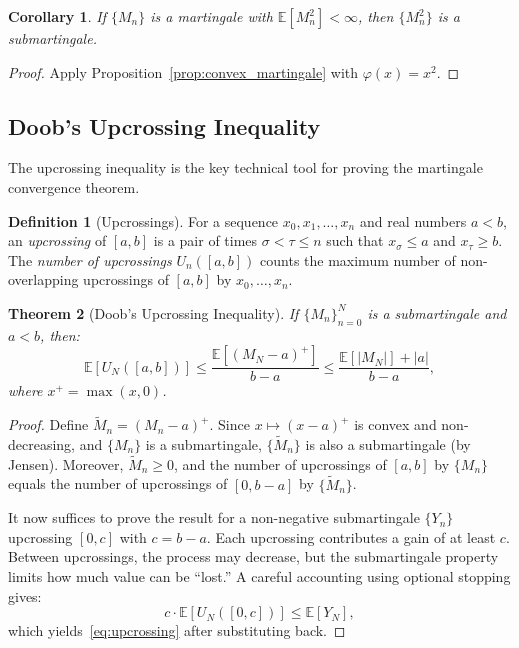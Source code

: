 \documentclass[11pt,a4paper]{article}
\theoremstyle{definition}
\newtheorem{definition}{Definition}[section]
\theoremstyle{plain}
\newtheorem{theorem}{Theorem}[section]
\newtheorem{corollary}[theorem]{Corollary}
\theoremstyle{remark}
\newcommand{\E}{\mathbb{E}}
\begin{document}
\begin{corollary}
\label{cor:squared_submartingale}
If $\{M_n\}$ is a martingale with $\E[M_n^2] < \infty$, then $\{M_n^2\}$ is a submartingale.
\end{corollary}

\begin{proof}
Apply Proposition~\ref{prop:convex_martingale} with $\varphi(x) = x^2$.
\end{proof}

\subsection{Doob's Upcrossing Inequality}
\label{subsec:upcrossing}

The upcrossing inequality is the key technical tool for proving the martingale convergence theorem.

\begin{definition}[Upcrossings]
\label{def:upcrossing}
For a sequence $x_0, x_1, \ldots, x_n$ and real numbers $a < b$, an \emph{upcrossing} of $[a, b]$ is a pair of times $\sigma < \tau \leq n$ such that $x_\sigma \leq a$ and $x_\tau \geq b$. The \emph{number of upcrossings} $U_n([a,b])$ counts the maximum number of non-overlapping upcrossings of $[a,b]$ by $x_0, \ldots, x_n$.
\end{definition}

\begin{keyresult}
\begin{theorem}[Doob's Upcrossing Inequality]
\label{thm:upcrossing}
If $\{M_n\}_{n=0}^N$ is a submartingale and $a < b$, then:
\begin{equation}
    \E[U_N([a,b])] \leq \frac{\E[(M_N - a)^+]}{b - a} \leq \frac{\E[|M_N|] + |a|}{b - a},
    \label{eq:upcrossing}
\end{equation}
where $x^+ = \max(x, 0)$.
\end{theorem}
\end{keyresult}

\begin{proof}
Define $\tilde{M}_n = (M_n - a)^+$. Since $x \mapsto (x - a)^+$ is convex and non-decreasing, and $\{M_n\}$ is a submartingale, $\{\tilde{M}_n\}$ is also a submartingale (by Jensen). Moreover, $\tilde{M}_n \geq 0$, and the number of upcrossings of $[a, b]$ by $\{M_n\}$ equals the number of upcrossings of $[0, b-a]$ by $\{\tilde{M}_n\}$.

It now suffices to prove the result for a non-negative submartingale $\{Y_n\}$ upcrossing $[0, c]$ with $c = b - a$. Each upcrossing contributes a gain of at least $c$. Between upcrossings, the process may decrease, but the submartingale property limits how much value can be ``lost.'' A careful accounting using optional stopping gives:
\begin{equation}
    c \cdot \E[U_N([0, c])] \leq \E[Y_N],
\end{equation}
which yields~\eqref{eq:upcrossing} after substituting back.
\end{proof}
\end{document}

